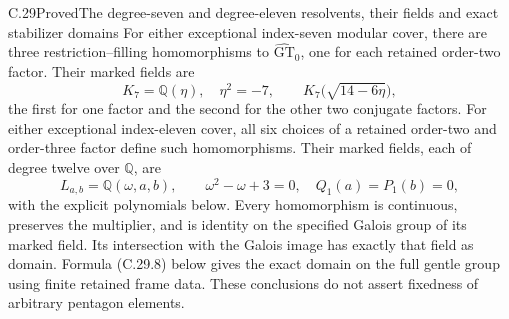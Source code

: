 \begin{statement}{C.29}{Proved}{The degree-seven and degree-eleven resolvents, their fields and exact stabilizer domains}
For either exceptional index-seven modular cover, there
are three restriction--filling homomorphisms to
$\widehat{\mathrm{GT}}_0$, one for each retained
order-two factor. Their marked fields are
\[
 K_7=\mathbb Q(\eta),\quad \eta^2=-7,
 \qquad K_7\bigl(\sqrt{14-6\eta}\bigr),
 \tag{C.29.1}
\]
the first for one factor and the second for the other two
conjugate factors. For either exceptional index-eleven
cover, all six choices of a retained order-two and
order-three factor define such homomorphisms. Their
marked fields, each of degree twelve over $\mathbb Q$,
are
\[
 L_{a,b}=\mathbb Q(\omega,a,b),\qquad
 \omega^2-\omega+3=0,\quad Q_1(a)=P_1(b)=0,
 \tag{C.29.2}
\]
with the explicit polynomials below. Every homomorphism
is continuous, preserves the multiplier, and is identity
on the specified Galois group of its marked field.
Its intersection with the Galois image has exactly that
field as domain. Formula (C.29.8) below gives the exact
domain on the full gentle group using finite retained
frame data. These conclusions do not assert fixedness
of arbitrary pentagon elements.
\end{statement}
